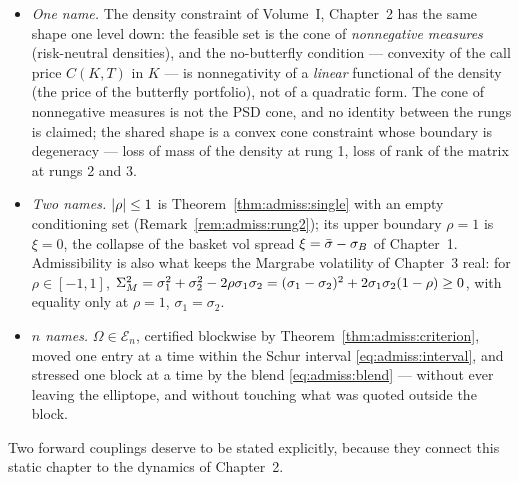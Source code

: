 \begin{itemize}
  \item \emph{One name.} The density constraint of Volume~I, Chapter~2 has
        the same shape one level down: the feasible set is the cone of
        \emph{nonnegative measures} (risk-neutral densities), and the
        no-butterfly condition --- convexity of the call price $C(K,T)$ in
        $K$ --- is nonnegativity of a \emph{linear} functional of the
        density (the price of the butterfly portfolio), not of a quadratic
        form. The cone of nonnegative measures is not the PSD cone, and no
        identity between the rungs is claimed; the shared shape is a convex
        cone constraint whose boundary is degeneracy --- loss of mass of
        the density at rung 1, loss of rank of the matrix at rungs 2
        and 3.
  \item \emph{Two names.} $\lvert\rho\rvert \le 1$ is
        Theorem~\ref{thm:admiss:single} with an empty conditioning set
        (Remark~\ref{rem:admiss:rung2}); its upper boundary $\rho = 1$ is
        $\xi = 0$, the collapse of the basket vol spread
        $\xi = \bar\sigma - \sigma_B$ of Chapter~1. Admissibility is also what
        keeps the Margrabe volatility of Chapter~3 real: for
        $\rho \in [-1, 1]$,
        $\Sigma_M^2 = \sigma_1^2 + \sigma_2^2 - 2\rho\sigma_1\sigma_2
        = (\sigma_1 - \sigma_2)^2 + 2 \sigma_1 \sigma_2 (1 - \rho) \ge 0$,
        with equality only at $\rho = 1$, $\sigma_1 = \sigma_2$.
  \item \emph{$n$ names.} $\Omega \in \mathcal{E}_n$, certified blockwise
        by Theorem~\ref{thm:admiss:criterion}, moved one entry at a time
        within the Schur interval \eqref{eq:admiss:interval}, and stressed
        one block at a time by the blend \eqref{eq:admiss:blend} ---
        without ever leaving the elliptope, and without touching what was
        quoted outside the block.
\end{itemize}

Two forward couplings deserve to be stated explicitly, because they connect
this static chapter to the dynamics of Chapter~2.

